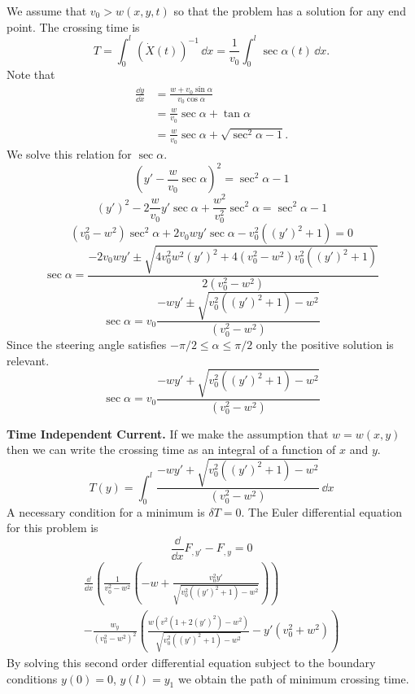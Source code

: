 \begin{Solution}
  We assume that $v_0 > w(x,y,t)$ so that the problem has a solution for 
  any end point.  The crossing time is
  \[
  T = \int_0^l \left( \dot{X}(t) \right)^{-1} \,\dd x
  = \frac{1}{v_0} \int_0^l \sec \alpha(t) \,\dd x.
  \]
  Note that
  \begin{align*}
    \frac{\dd y}{\dd x} 
    &= \frac{w + v_0 \sin \alpha}{v_0 \cos \alpha} \\
    &= \frac{w}{v_0} \sec \alpha + \tan \alpha \\
    &= \frac{w}{v_0} \sec \alpha + \sqrt{\sec^2 \alpha - 1 }.
  \end{align*}
  We solve this relation for $\sec \alpha$.
  \[
  \left( y' - \frac{w}{v_0} \sec \alpha \right)^2 = \sec^2 \alpha - 1
  \]
  \[
  (y')^2 - 2 \frac{w}{v_0} y' \sec \alpha + \frac{w^2}{v_0^2} \sec^2 \alpha
  = \sec^2 \alpha - 1
  \]
  \[
  (v_0^2 - w^2) \sec^2 \alpha + 2 v_0 w y' \sec \alpha - v_0^2 ((y')^2 + 1) = 0
  \]
  \[
  \sec \alpha = \frac{ - 2 v_0 w y' \pm \sqrt{ 4 v_0^2 w^2 (y')^2 +
      4 (v_0^2 - w^2) v_0^2 ((y')^2 + 1) } }{ 2 (v_0^2 - w^2) }
  \]
  \[
  \sec \alpha = v_0 \frac{ - w y' \pm \sqrt{ 
      v_0^2 ((y')^2 + 1)  - w^2 } }{ (v_0^2 - w^2) }
  \]
  Since the steering angle satisfies $-\pi/2 \leq \alpha \leq \pi/2$ only 
  the positive solution is relevant.
  \[
  \sec \alpha = v_0 \frac{ - w y' + \sqrt{ 
      v_0^2 ((y')^2 + 1)  - w^2 } }{ (v_0^2 - w^2) }
  \]

  \textbf{Time Independent Current.}
  If we make the assumption that $w = w(x,y)$ then we can write the 
  crossing time as an integral of a function of $x$ and $y$.  
  \[
  T(y) = \int_0^l \frac{ - w y' + \sqrt{ 
      v_0^2 ((y')^2 + 1)  - w^2 } }{ (v_0^2 - w^2) } \,\dd x
  \]
  A necessary condition for a minimum is $\delta T = 0$.  The Euler differential
  equation for this problem is
  \[
  \frac{\dd}{\dd x} F_{,y'} - F_{,y} = 0
  \]
  \begin{multline*}
    \frac{\dd}{\dd x} \left( \frac{1}{v_0^2 - w^2} 
      \left( - w + \frac{v_0^2 y'}{\sqrt{ v_0^2 ((y')^2 + 1) - w^2 }} \right)
    \right)
    \\
    - \frac{w_y}{(v_0^2 - w^2)^2} \left( 
      \frac{ w (v^2 (1 + 2 (y')^2) - w^2 ) }{ \sqrt{v_0^2 ((y')^2+1) - w^2 } }
      - y' (v_0^2 + w^2 ) \right)
  \end{multline*}
  By solving this second order differential equation subject to the boundary
  conditions $y(0) = 0$, $y(l) = y_1$ we obtain the path of minimum crossing
  time.


\end{Solution}
